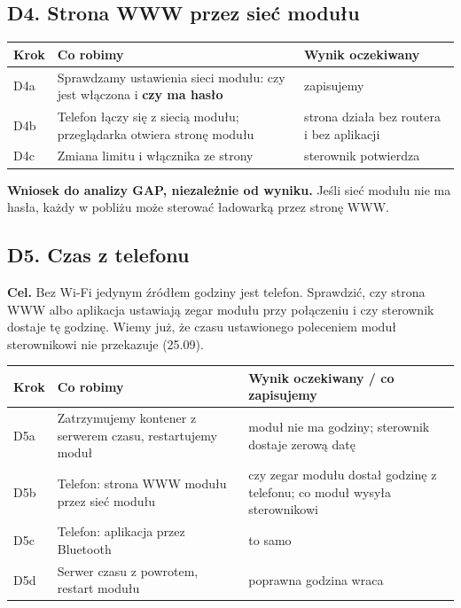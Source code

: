 \documentclass[11pt,a4paper]{article}
\begin{document}
\subsection{D4. Strona WWW przez sieć modułu}

\begin{longtable}{>{\raggedright\arraybackslash}p{3.00cm}>{\raggedright\arraybackslash}p{8.35cm}>{\raggedright\arraybackslash}p{3.93cm}}
\toprule
\rowcolor{apteallight}\textbf{Krok} & \textbf{Co robimy} & \textbf{Wynik oczekiwany} \\
\midrule\endhead
\bottomrule\endfoot
D4a & Sprawdzamy ustawienia sieci modułu: czy jest włączona i \textbf{czy ma hasło} & zapisujemy \\
D4b & Telefon łączy się z siecią modułu; przeglądarka otwiera stronę modułu & strona działa bez routera i bez aplikacji \\
D4c & Zmiana limitu i włącznika ze strony & sterownik potwierdza \\
\end{longtable}

\textbf{Wniosek do analizy GAP, niezależnie od wyniku.} Jeśli sieć modułu nie ma hasła, każdy w pobliżu może sterować ładowarką przez stronę WWW.


\subsection{D5. Czas z telefonu}

\textbf{Cel.} Bez Wi-Fi jedynym źródłem godziny jest telefon. Sprawdzić, czy strona WWW albo aplikacja ustawiają zegar modułu przy połączeniu i czy sterownik dostaje tę godzinę. Wiemy już, że czasu ustawionego poleceniem moduł sterownikowi nie przekazuje (25.09).


\begin{longtable}{>{\raggedright\arraybackslash}p{3.00cm}>{\raggedright\arraybackslash}p{6.14cm}>{\raggedright\arraybackslash}p{6.14cm}}
\toprule
\rowcolor{apteallight}\textbf{Krok} & \textbf{Co robimy} & \textbf{Wynik oczekiwany / co zapisujemy} \\
\midrule\endhead
\bottomrule\endfoot
D5a & Zatrzymujemy kontener z serwerem czasu, restartujemy moduł & moduł nie ma godziny; sterownik dostaje zerową datę \\
D5b & Telefon: strona WWW modułu przez sieć modułu & czy zegar modułu dostał godzinę z telefonu; co moduł wysyła sterownikowi \\
D5c & Telefon: aplikacja przez Bluetooth & to samo \\
D5d & Serwer czasu z powrotem, restart modułu & poprawna godzina wraca \\
\end{longtable}
\end{document}
